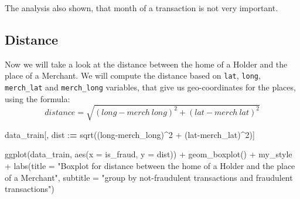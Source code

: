 \documentclass[
]{report}
\newenvironment{Shaded}{\begin{snugshade}}{\end{snugshade}}
\newcommand{\AttributeTok}[1]{\textcolor[rgb]{0.77,0.63,0.00}{#1}}
\newcommand{\DecValTok}[1]{\textcolor[rgb]{0.00,0.00,0.81}{#1}}
\newcommand{\ErrorTok}[1]{\textcolor[rgb]{0.64,0.00,0.00}{\textbf{#1}}}
\newcommand{\FunctionTok}[1]{\textcolor[rgb]{0.00,0.00,0.00}{#1}}
\newcommand{\NormalTok}[1]{#1}
\newcommand{\SpecialCharTok}[1]{\textcolor[rgb]{0.00,0.00,0.00}{#1}}
\newcommand{\StringTok}[1]{\textcolor[rgb]{0.31,0.60,0.02}{#1}}
\begin{document}
The analysis also shown, that month of a transaction is not very
important.

\hypertarget{distance}{%
\subsection{Distance}\label{distance}}

Now we will take a look at the distance between the home of a Holder and
the place of a Merchant. We will compute the distance based on
\texttt{lat}, \texttt{long}, \texttt{merch\_lat} and
\texttt{merch\_long} variables, that give us geo-coordinates for the
places, using the formula:
\[distance = \sqrt{(long-merch\ long)^2 + (lat-merch\ lat)^2}\]

\begin{Shaded}
\begin{Highlighting}[]
\NormalTok{data\_train[, dist }\SpecialCharTok{:}\ErrorTok{=} \FunctionTok{sqrt}\NormalTok{((long}\SpecialCharTok{{-}}\NormalTok{merch\_long)}\SpecialCharTok{\^{}}\DecValTok{2} \SpecialCharTok{+}\NormalTok{ (lat}\SpecialCharTok{{-}}\NormalTok{merch\_lat)}\SpecialCharTok{\^{}}\DecValTok{2}\NormalTok{)]}
\end{Highlighting}
\end{Shaded}

\begin{Shaded}
\begin{Highlighting}[]
\FunctionTok{ggplot}\NormalTok{(data\_train, }\FunctionTok{aes}\NormalTok{(}\AttributeTok{x =}\NormalTok{ is\_fraud, }\AttributeTok{y =}\NormalTok{ dist)) }\SpecialCharTok{+}
  \FunctionTok{geom\_boxplot}\NormalTok{() }\SpecialCharTok{+}
\NormalTok{  my\_style }\SpecialCharTok{+}
  \FunctionTok{labs}\NormalTok{(}\AttributeTok{title =} \StringTok{"Boxplot for distance between the home of a Holder and the place of a Merchant"}\NormalTok{,}
       \AttributeTok{subtitle =} \StringTok{"group by not{-}fraudulent transactions and fraudulent transactions"}\NormalTok{)}
\end{Highlighting}
\end{Shaded}
\end{document}
